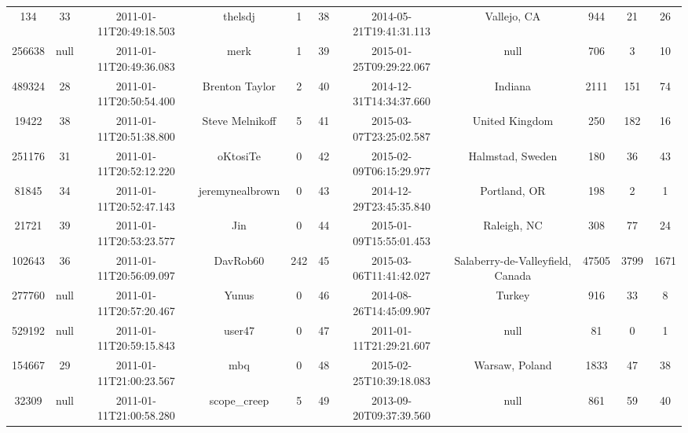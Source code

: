 \documentclass[12pt,a4paper,twoside,openright,titlepage,final]{article}
\begin{document}
\begin{landscape}
\begin{center}
\begin{longtable}{@{\extracolsep{\fill}}*{11}{c}}
			134       & 33   & 2011-01-11T20:49:18.503 & thelsdj               & 1         & 38    & 2014-05-21T19:41:31.113 & Vallejo, CA                      & 944        & 21      & 26    \\
			256638    & null & 2011-01-11T20:49:36.083 & merk                  & 1         & 39    & 2015-01-25T09:29:22.067 & null                             & 706        & 3       & 10    \\
			489324    & 28   & 2011-01-11T20:50:54.400 & Brenton Taylor        & 2         & 40    & 2014-12-31T14:34:37.660 & Indiana                          & 2111       & 151     & 74    \\
			19422     & 38   & 2011-01-11T20:51:38.800 & Steve Melnikoff       & 5         & 41    & 2015-03-07T23:25:02.587 & United Kingdom                   & 250        & 182     & 16    \\
			251176    & 31   & 2011-01-11T20:52:12.220 & oKtosiTe              & 0         & 42    & 2015-02-09T06:15:29.977 & Halmstad, Sweden                 & 180        & 36      & 43    \\
			81845     & 34   & 2011-01-11T20:52:47.143 & jeremynealbrown       & 0         & 43    & 2014-12-29T23:45:35.840 & Portland, OR                     & 198        & 2       & 1     \\
			21721     & 39   & 2011-01-11T20:53:23.577 & Jin                   & 0         & 44    & 2015-01-09T15:55:01.453 & Raleigh, NC                      & 308        & 77      & 24    \\
			102643    & 36   & 2011-01-11T20:56:09.097 & DavRob60              & 242       & 45    & 2015-03-06T11:41:42.027 & Salaberry-de-Valleyfield, Canada & 47505      & 3799    & 1671  \\
			277760    & null & 2011-01-11T20:57:20.467 & Yunus                 & 0         & 46    & 2014-08-26T14:45:09.907 & Turkey                           & 916        & 33      & 8     \\
			529192    & null & 2011-01-11T20:59:15.843 & user47                & 0         & 47    & 2011-01-11T21:29:21.607 & null                             & 81         & 0       & 1     \\
			154667    & 29   & 2011-01-11T21:00:23.567 & mbq                   & 0         & 48    & 2015-02-25T10:39:18.083 & Warsaw, Poland                   & 1833       & 47      & 38    \\
			32309     & null & 2011-01-11T21:00:58.280 & scope\_creep          & 5         & 49    & 2013-09-20T09:37:39.560 & null                             & 861        & 59      & 40    \\

\end{longtable}
\end{center}
\end{landscape}
\end{document}
